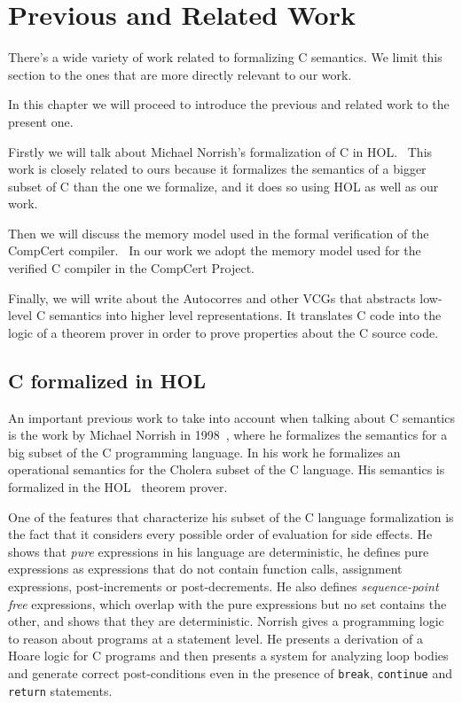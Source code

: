 \chapter{Previous and Related Work}\label{chapter:previous}

There's a wide variety of work related to formalizing C semantics.
We limit this section to the ones that are more directly relevant to our work.

In this chapter we will proceed to introduce the previous and related work to the present one.

Firstly we will talk about Michael Norrish's formalization of C in HOL.~\parencite{norrish}
This work is closely related to ours because it formalizes the semantics of a bigger subset of C than the one we formalize, and it does so using HOL as well as our work.

Then we will discuss the memory model used in the formal verification of the CompCert compiler.~\parencite{leroy-blazy-memory-model}
In our work we adopt the memory model used for the verified C compiler in the CompCert Project.

Finally, we will write about the Autocorres and other VCGs that abstracts low-level C semantics into higher level representations.
It translates C code into the logic of a theorem prover in order to prove properties about the C source code.

\section{C formalized in HOL}

An important previous work to take into account when talking about C semantics is the work by Michael Norrish in 1998~\parencite{norrish}, where he formalizes the semantics for a big subset of the C programming language.
In his work he formalizes an operational semantics for the Cholera subset of the C language.
His semantics is formalized in the HOL~\parencite{hol-doc} theorem prover.

One of the features that characterize his subset of the C language formalization is the fact that it considers every possible order of evaluation for side effects.
He shows that \textit{pure} expressions in his language are deterministic, he defines pure expressions as expressions that do not contain function calls, assignment expressions, post-increments or post-decrements.
He also defines \textit{sequence-point free} expressions, which overlap with the pure expressions but no set contains the other, and shows that they are deterministic.
Norrish gives a programming logic to reason about programs at a statement level.
He presents a derivation of a Hoare logic for C programs and then presents a system for analyzing loop bodies and generate correct post-conditions even in the presence of \verb|break|, \verb|continue| and \verb|return| statements.

